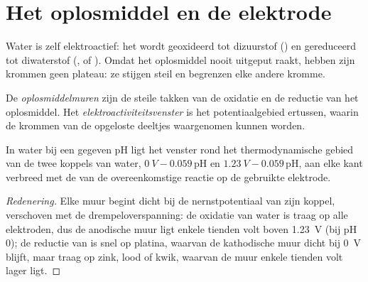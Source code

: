 \section{Het oplosmiddel en de elektrode}

Water is zelf elektroactief: het wordt geoxideerd tot dizuurstof
() en gereduceerd tot diwaterstof (, of
). Omdat het oplosmiddel nooit uitgeput raakt, hebben zijn krommen
geen plateau: ze stijgen steil en begrenzen elke andere kromme.

\begin{definition}[Elektroactiviteitsvenster]\label{def:b2:current-potential-curves:window}
De \emph{oplosmiddelmuren} zijn de steile takken van de
oxidatie en de reductie van het oplosmiddel. Het
\emph{elektroactiviteitsvenster} is het potentiaalgebied
ertussen, waarin de krommen van de opgeloste deeltjes waargenomen kunnen worden.
\end{definition}

\begin{proposition}\label{prop:b2:current-potential-curves:window}
In water bij een gegeven pH ligt het venster rond het thermodynamische gebied van de
twee koppels van water, $\qty{0}{V} - 0.059\,\mathrm{pH}$ en $\qty{1.23}{V} -
0.059\,\mathrm{pH}$, aan elke kant verbreed met de  van de
overeenkomstige reactie op de gebruikte elektrode.
\end{proposition}

\begin{proof}[Redenering]
Elke muur begint dicht bij de nernstpotentiaal van zijn koppel, verschoven met de
drempeloverspanning: de oxidatie van water is traag op alle elektroden, dus
de anodische muur ligt enkele tienden volt boven \qty{1.23}{V} (bij pH 0); de
reductie van  is snel op platina, waarvan de kathodische muur dicht bij
\qty{0}{V} blijft, maar traag op zink, lood of kwik, waarvan de muur enkele tienden
volt lager ligt.
\end{proof}

